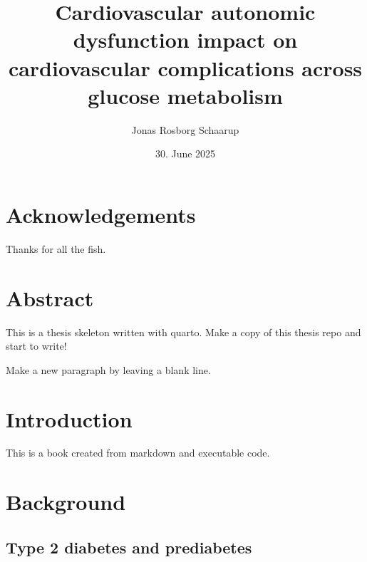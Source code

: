 \documentclass[
  a4paper,
  headsepline=true,
  open=any]{scrbook}
\title{Cardiovascular autonomic dysfunction impact on cardiovascular
complications across glucose metabolism}
\author{Jonas Rosborg Schaarup}
\date{30. June 2025}
\begin{document}
\frontmatter
\maketitle
\ifdefined\Shaded\renewenvironment{Shaded}{\begin{tcolorbox}[boxrule=0pt, frame hidden, borderline west={3pt}{0pt}{shadecolor}, interior hidden, enhanced, sharp corners, breakable]}{\end{tcolorbox}}\fi

\mainmatter
{}

\hypertarget{acknowledgements}{%
\chapter*{Acknowledgements}\label{acknowledgements}}


Thanks for all the fish.


\hypertarget{abstract}{%
\chapter*{Abstract}\label{abstract}}


This is a thesis skeleton written with quarto. Make a copy of this
thesis repo and start to write!

Make a new paragraph by leaving a blank line.

\newpage
\tableofcontents


\hypertarget{introduction}{%
\chapter{Introduction}\label{introduction}}

This is a book created from markdown and executable code.


\hypertarget{background}{%
\chapter{Background}\label{background}}

\hypertarget{type-2-diabetes-and-prediabetes}{%
\section{Type 2 diabetes and
prediabetes}\label{type-2-diabetes-and-prediabetes}}
\end{document}
